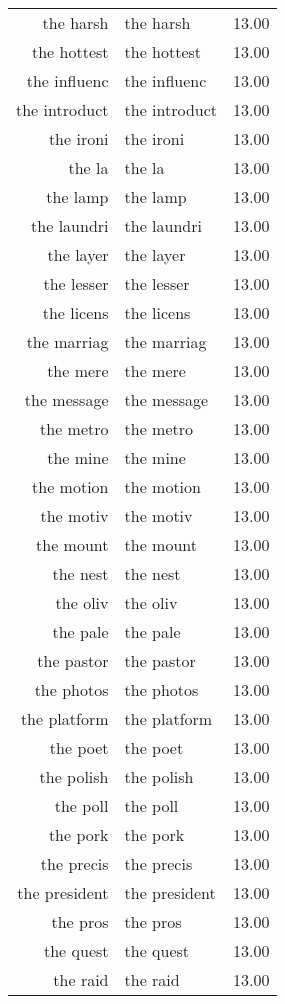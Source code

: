 \begin{table}[ht]
\begin{tabular}{rlr}
  the harsh & the harsh & 13.00 \\ 
  the hottest & the hottest & 13.00 \\ 
  the influenc & the influenc & 13.00 \\ 
  the introduct & the introduct & 13.00 \\ 
  the ironi & the ironi & 13.00 \\ 
  the la & the la & 13.00 \\ 
  the lamp & the lamp & 13.00 \\ 
  the laundri & the laundri & 13.00 \\ 
  the layer & the layer & 13.00 \\ 
  the lesser & the lesser & 13.00 \\ 
  the licens & the licens & 13.00 \\ 
  the marriag & the marriag & 13.00 \\ 
  the mere & the mere & 13.00 \\ 
  the message & the message & 13.00 \\ 
  the metro & the metro & 13.00 \\ 
  the mine & the mine & 13.00 \\ 
  the motion & the motion & 13.00 \\ 
  the motiv & the motiv & 13.00 \\ 
  the mount & the mount & 13.00 \\ 
  the nest & the nest & 13.00 \\ 
  the oliv & the oliv & 13.00 \\ 
  the pale & the pale & 13.00 \\ 
  the pastor & the pastor & 13.00 \\ 
  the photos & the photos & 13.00 \\ 
  the platform & the platform & 13.00 \\ 
  the poet & the poet & 13.00 \\ 
  the polish & the polish & 13.00 \\ 
  the poll & the poll & 13.00 \\ 
  the pork & the pork & 13.00 \\ 
  the precis & the precis & 13.00 \\ 
  the president & the president & 13.00 \\ 
  the pros & the pros & 13.00 \\ 
  the quest & the quest & 13.00 \\ 
  the raid & the raid & 13.00 \\ 

\end{tabular}
\end{table}
